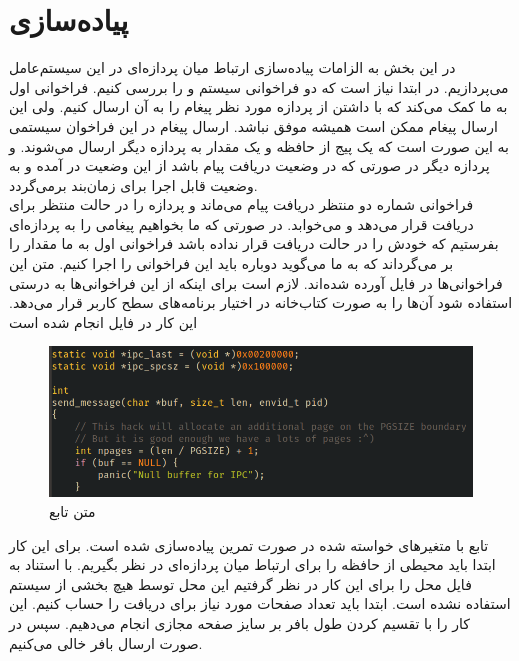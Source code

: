 \documentclass[a4paper, 12pt]{article}
\begin{document}
\section{
    پیاده‌سازی
}
در این بخش به الزامات پیاده‌سازی ارتباط میان‌ پردازه‌ای در این سیستم‌عامل می‌پردازیم.
در ابتدا نیاز است که دو فراخوانی سیستم
و
را بررسی کنیم.
فراخوانی اول به ما کمک می‌کند که با داشتن
از پردازه مورد نظر پیغام را به آن ارسال کنیم.
ولی این ارسال پیغام ممکن است همیشه موفق نباشد.
ارسال پیغام در این فراخوان سیستمی به این صورت است که یک پیج از حافظه و یک مقدار به پردازه دیگر ارسال می‌شوند.
و پردازه دیگر در صورتی که در وضعیت دریافت پیام باشد از این وضعیت در آمده و به وضعیت قابل اجرا
برای زمان‌بند برمی‌گردد. \\
فراخوانی شماره دو منتظر دریافت پیام می‌ماند و پردازه را در حالت منتظر برای دریافت قرار می‌دهد
و می‌خوابد. در صورتی که ما بخواهیم پیغامی را به پردازه‌ای بفرستیم که خودش را در حالت دریافت قرار
نداده باشد فراخوانی اول به ما مقدار
را بر می‌گرداند که به ما می‌گوید دوباره باید این فراخوانی را اجرا کنیم.
متن این فراخوانی‌ها در فایل‌
آورده شده‌اند.
لازم است برای اینکه از این فراخوانی‌ها به درستی استفاده شود آن‌ها را به صورت کتاب‌خانه در اختیار
برنامه‌های سطح کاربر قرار می‌دهد.
این کار در فایل
انجام شده است
\begin{figure}[H]
    \centering
    \includegraphics[width=1.0\textwidth]{send1.png}
    \caption{
        متن تابع
    }
    \label{fig3:output}
\end{figure}
تابع
با متغیر‌های خواسته شده در صورت تمرین پیاده‌سازی شده است.
برای این کار ابتدا باید محیطی از حافظه را برای ارتباط میان‌ پردازه‌ای در نظر بگیریم.
با استناد به فایل
محل
را برای این کار در نظر گرفتیم این محل توسط هیچ بخشی از سیستم استفاده نشده است.
ابتدا باید تعداد صفحات مورد نیاز برای دریافت را حساب کنیم.
این کار را با تقسیم کردن طول بافر بر سایز صفحه مجازی انجام می‌دهیم.
سپس در صورت ارسال بافر خالی
می‌کنیم.
\end{document}
